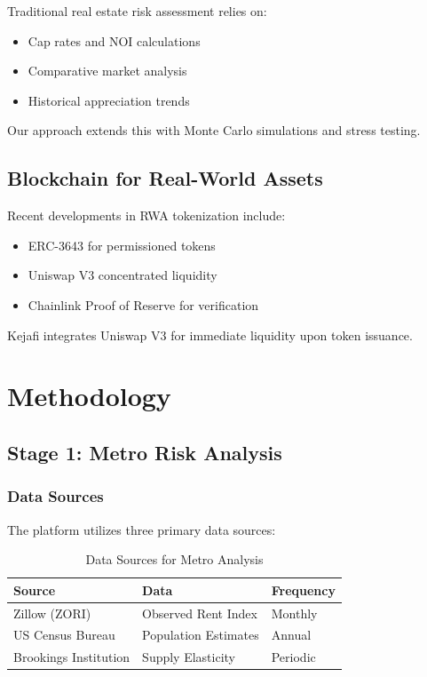 ﻿\documentclass[12pt]{article}
\begin{document}
Traditional real estate risk assessment relies on:
\begin{itemize}
    \item Cap rates and NOI calculations
    \item Comparative market analysis
    \item Historical appreciation trends
\end{itemize}
Our approach extends this with Monte Carlo simulations and stress testing.

\subsection{Blockchain for Real-World Assets}

Recent developments in RWA tokenization include:
\begin{itemize}
    \item ERC-3643 for permissioned tokens
    \item Uniswap V3 concentrated liquidity
    \item Chainlink Proof of Reserve for verification
\end{itemize}
Kejafi integrates Uniswap V3 for immediate liquidity upon token issuance.

\section{Methodology}

\subsection{Stage 1: Metro Risk Analysis}

\subsubsection{Data Sources}

The platform utilizes three primary data sources:

\begin{table}[H]
\centering
\caption{Data Sources for Metro Analysis}
\label{tab:data-sources}
\begin{tabular}{@{}lll@{}}
\toprule
\textbf{Source} & \textbf{Data} & \textbf{Frequency} \\
\midrule
Zillow (ZORI) & Observed Rent Index & Monthly \\
US Census Bureau & Population Estimates & Annual \\
Brookings Institution & Supply Elasticity & Periodic \\
\bottomrule
\end{tabular}
\end{table}
\end{document}
